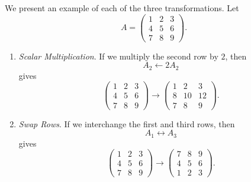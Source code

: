 	\begin{example}
	  \label{ex:elementary-row-transformations}
	  We present an example of each of the three transformations. Let
		\begin{equation}
		  A =
		  \begin{pmatrix}
		  	1 & 2 & 3 \\
		  	4 & 5 & 6 \\
		  	7 & 8 & 9
		  \end{pmatrix}.
		\end{equation}
		\begin{enumerate}
		  \item \textit{Scalar Multiplication}. If we multiply the second row by $2$, then
			\begin{equation}
			  A_2 \gets 2 A_2
			\end{equation}
			gives
			\begin{equation}
			  \begin{pmatrix}
			  	1 & 2 & 3 \\
			  	4 & 5 & 6 \\
			  	7 & 8 & 9
			  \end{pmatrix}
			  \to
			  \begin{pmatrix}
			  	1 & 2 & 3 \\
			  	8 & 10 & 12 \\
			  	7 & 8 & 9
			  \end{pmatrix}.
			\end{equation}

			\item \textit{Swap Rows}. If we interchange the first and third rows, then
			\begin{equation}
			  A_1 \leftrightarrow A_3
			\end{equation}
			gives
			\begin{equation}
			  \begin{pmatrix}
			  	1 & 2 & 3 \\
			  	4 & 5 & 6 \\
			  	7 & 8 & 9
			  \end{pmatrix}
			  \to
			  \begin{pmatrix}
			  	7 & 8 & 9 \\
			  	4 & 5 & 6 \\
			  	1 & 2 & 3
			  \end{pmatrix}.
			\end{equation}


\end{enumerate}
\end{example}
